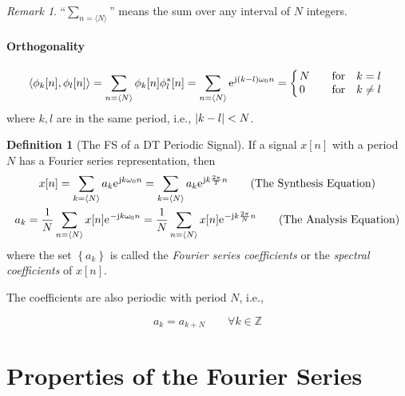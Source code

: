 \documentclass[10pt,UTF8]{article}
\makeatletter
\newenvironment{definition box}
{\begin{tcolorbox}[colback=blue!5!white,colframe=blue!75!black,parbox=false,before upper=\par,before lower=\par]}
{\end{tcolorbox}}
\newenvironment{theorem box}
{\begin{tcolorbox}[colback=yellow!5!white,colframe=yellow!75!black,parbox=false,before upper=\par,before lower=\par]}
{\end{tcolorbox}}
\theoremstyle{definition}
\newtheorem{definition inner}{Definition}[section]
\newenvironment{definition}[1][]
{\begin{definition box}\begin{definition inner}[#1]\hfill\par}
{\end{definition inner}\end{definition box}}
\theoremstyle{plain}
\newtheorem{theorem inner}{Theorem}[section]
\theoremstyle{definition}
\newtheorem*{proof inner}{\textit{Proof}}
\theoremstyle{remark}
\newtheorem*{remark}{\textit{Remark}}
\newcommand{\mycases}[2][0.8]{
    \left\{\vphantom{\scalebox{#1}{
        $\begin{matrix}#2\end{matrix}$
    }}\right.\!\!\!\!
    \begin{array}{l@{\quad}l}#2\end{array}
}
\newcommand{\ju}{\mathrm{j}}  %
\newcommand{\e}{\mathrm{e}{\mkern 1 mu}}
\makeatother
\begin{document}
\begin{remark}
    ``$\sum\limits_{\scriptscriptstyle n=\langle N\rangle}$''
    means the sum over any interval of $N$ integers.
\end{remark}

\paragraph{Orthogonality}
\begin{equation*}
    \left\langle \phi_k[n], \phi_l[n] \right\rangle
    = \sum_{n=\langle N\rangle}\phi_k[n]\phi_l^\ast[n]
    = \sum_{n=\langle N\rangle}\e^{\ju (k-l)\omega_0 n}
    = \mycases{
        N & \qfor k=l \\
        0 & \qfor k\neq l
    }
\end{equation*}
where $k,l$ are in the same period, i.e., $\abs{k-l}<N$.

\begin{definition}[The FS of a DT Periodic Signal]
    If a signal $x[n]$ with a period $N$ has a Fourier series representation,
    then
    \begin{gather*}
        x[n] = \sum_{k=\langle N\rangle} a_k \e^{\ju k \omega_0 n}
        = \sum_{k=\langle N\rangle} a_k \e^{\ju k\frac{2\pi}{T}n}
        \tag{The Synthesis Equation} \\
        a_k = \frac{1}{N} \sum_{n=\langle N\rangle} x[n] \e^{-\ju k\omega_0 n}
        = \frac{1}{N} \sum_{n=\langle N\rangle} x[n] \e^{-\ju k\frac{2\pi}{N}n}
        \tag{The Analysis Equation}
    \end{gather*}
    where the set $\left\{a_k\right\}$ is called
    the \emph{Fourier series coefficients} or
    the \emph{spectral coefficients} of $x[n]$.
\end{definition}
The coefficients are also periodic with period $N$, i.e.,
\begin{theorem box}
    \begin{equation*}
        a_k = a_{k+N} \qquad \forall k \in \mathbb{Z}
    \end{equation*}
\end{theorem box}

\section{Properties of the Fourier Series}

\subsection{}
\end{document}
